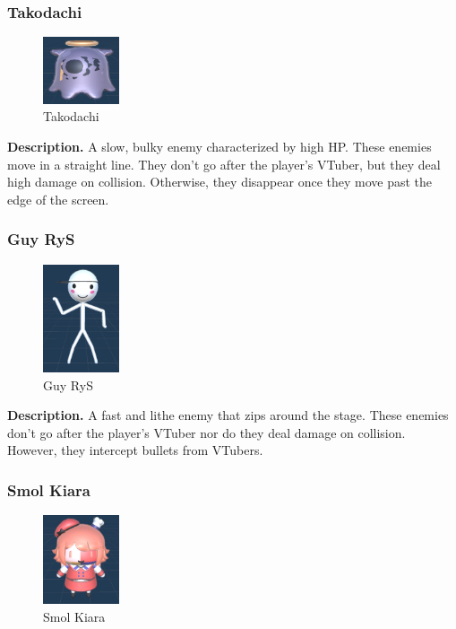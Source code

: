 \documentclass[10pt, a4paper]{article}
\begin{document}
\begin{multicols}{2}
	\subsubsection{Takodachi}

	\begin{figure}[H]
		\centering
		\includegraphics[width=0.2\textwidth]{images/takodachi1.png}
		\caption{Takodachi}
		\label{fig:takodachi}
	\end{figure}

	\textbf{Description.} A slow, bulky enemy characterized by high HP. These enemies move in a straight line. They don't go after the player's VTuber, but they deal high damage on collision. Otherwise, they disappear once they move past the edge of the screen.

	\subsubsection{Guy RyS}

	\begin{figure}[H]
		\centering
		\includegraphics[width=0.2\textwidth]{images/guy_rys1.png}
		\caption{Guy RyS}
		\label{fig:guyrys}
	\end{figure}

	\textbf{Description.} A fast and lithe enemy that zips around the stage. These enemies don't go after the player's VTuber nor do they deal damage on collision. However, they intercept bullets from VTubers.

	\subsubsection{Smol Kiara}

	\begin{figure}[H]
		\centering
		\includegraphics[width=0.2\textwidth]{images/smol_kiara1.png}
		\caption{Smol Kiara}
		\label{fig:smolkiara}
	\end{figure}


\end{multicols}
\end{document}
